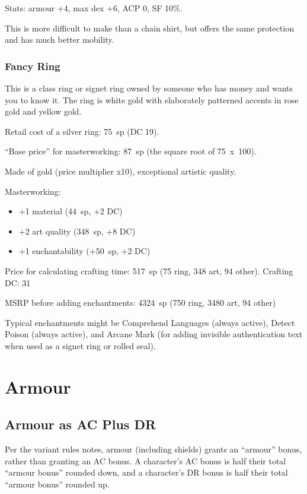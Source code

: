 Stats: armour +4, max dex +6, ACP 0, SF 10\%.

This is more difficult to make than a chain shirt, but offers the same
protection and has much better mobility.
%
\subsubsection{Fancy Ring}

This is a class ring or signet ring owned by someone who has money and
wants you to know it. The ring is white gold with elaborately patterned
accents in rose gold and yellow gold.

Retail cost of a silver ring: 75~sp (DC 19).

``Base price'' for masterworking: 87~sp (the square root of 75~x~100).

Made of gold (price multiplier x10), exceptional artistic quality.

Masterworking:
\begin{itemize}
\item +1 material (44~sp, +2 DC)
\item +2 art quality (348~sp, +8 DC)
\item +1 enchantability (+50~sp, +2 DC)
\end{itemize}

Price for calculating crafting time: 517~sp (75 ring, 348 art, 94 other).
Crafting DC: 31

MSRP before adding enchantments: 4324~sp (750 ring, 3480 art, 94 other)

Typical enchantments might be Comprehend Languages (always active), Detect
Poison (always active), and Arcane Mark (for adding invisible authentication
text when used as a signet ring or rolled seal).

%
%
\section{Armour}

%
\subsection{Armour as AC Plus DR}

Per the variant rules notes, armour (including shields) grants an ``armour''
bonus, rather than granting an AC bonus. A character's AC bonus is half
their total ``armour bonus'' rounded down, and a character's DR bonus is
half their total ``armour bonus'' rounded up.
%

